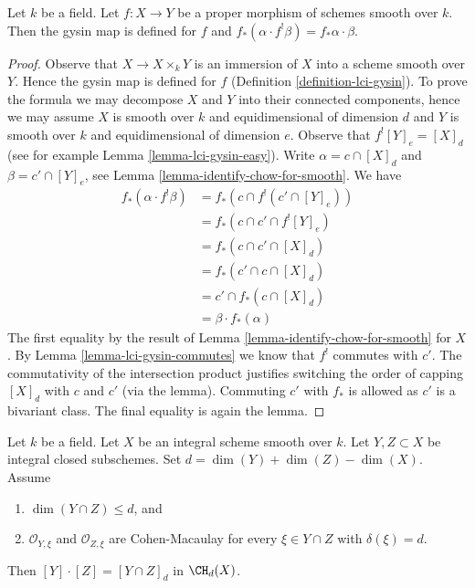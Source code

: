 \begin{lemma}
\label{lemma-projection-formula}
Let $k$ be a field. Let $f : X \to Y$ be a proper morphism of schemes smooth
over $k$. Then the gysin map is defined for $f$ and
$f_*(\alpha \cdot f^!\beta) = f_*\alpha \cdot \beta$.
\end{lemma}

\begin{proof}
Observe that $X \to X \times_k Y$ is an immersion of $X$ into a scheme
smooth over $Y$. Hence the gysin map is defined for $f$
(Definition \ref{definition-lci-gysin}).
To prove the formula we may decompose $X$ and $Y$ into their
connected components, hence we may assume $X$ is smooth over $k$
and equidimensional of dimension $d$ and $Y$ is smooth over $k$
and equidimensional of dimension $e$. Observe that
$f^![Y]_e = [X]_d$ (see for example Lemma \ref{lemma-lci-gysin-easy}).
Write $\alpha = c \cap [X]_d$ and $\beta = c' \cap [Y]_e$,
see Lemma \ref{lemma-identify-chow-for-smooth}. We have
\begin{align*}
f_*(\alpha \cdot f^!\beta)
& =
f_*(c \cap f^!(c' \cap [Y]_e)) \\
& =
f_*(c \cap c' \cap f^![Y]_e) \\
& =
f_*(c \cap c' \cap [X]_d) \\
& =
f_*(c' \cap c \cap [X]_d) \\
& =
c' \cap f_*(c \cap [X]_d) \\
& =
\beta \cdot f_*(\alpha)
\end{align*}
The first equality by the result of Lemma \ref{lemma-identify-chow-for-smooth}
for $X$. By Lemma \ref{lemma-lci-gysin-commutes} we know that $f^!$
commutes with $c'$. The commutativity of the intersection
product justifies switching the order of capping $[X]_d$ with $c$ and $c'$
(via the lemma). Commuting $c'$ with $f_*$ is allowed as $c'$
is a bivariant class. The final equality is again the lemma.
\end{proof}

\begin{lemma}
\label{lemma-intersect-properly}
Let $k$ be a field. Let $X$ be an integral scheme smooth over $k$.
Let $Y, Z \subset X$ be integral closed subschemes. Set
$d = \dim(Y) + \dim(Z) - \dim(X)$. Assume
\begin{enumerate}
\item $\dim(Y \cap Z) \leq d$, and
\item $\mathcal{O}_{Y, \xi}$ and $\mathcal{O}_{Z, \xi}$
are Cohen-Macaulay for every $\xi \in Y \cap Z$ with
$\delta(\xi) = d$.
\end{enumerate}
Then $[Y] \cdot [Z] = [Y \cap Z]_d$ in $\CH_d(X)$.
\end{lemma}

